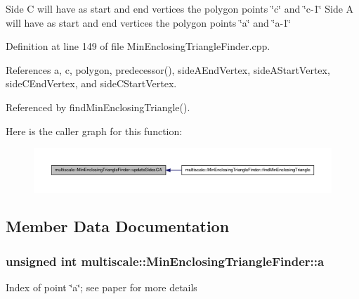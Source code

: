 \-Side \-C will have as start and end vertices the polygon points \char`\"{}c\char`\"{} and \char`\"{}c-\/1\char`\"{} \-Side \-A will have as start and end vertices the polygon points \char`\"{}a\char`\"{} and \char`\"{}a-\/1\char`\"{} 

\-Definition at line 149 of file \-Min\-Enclosing\-Triangle\-Finder.\-cpp.



\-References a, c, polygon, predecessor(), side\-A\-End\-Vertex, side\-A\-Start\-Vertex, side\-C\-End\-Vertex, and side\-C\-Start\-Vertex.



\-Referenced by find\-Min\-Enclosing\-Triangle().



\-Here is the caller graph for this function\-:\nopagebreak
\begin{figure}[H]
\begin{center}
\leavevmode
\includegraphics[width=350pt]{classmultiscale_1_1MinEnclosingTriangleFinder_a0f4a9131f5118fa0afc33344bdf67f16_icgraph}
\end{center}
\end{figure}




\subsection{\-Member \-Data \-Documentation}
\hypertarget{classmultiscale_1_1MinEnclosingTriangleFinder_acb13371219bdd9b7c57131f1535e4c89}{
\subsubsection[{a}]{\setlength{\rightskip}{0pt plus 5cm}unsigned int {\bf multiscale\-::\-Min\-Enclosing\-Triangle\-Finder\-::a}}}\label{classmultiscale_1_1MinEnclosingTriangleFinder_acb13371219bdd9b7c57131f1535e4c89}
\-Index of point \char`\"{}a\char`\"{}; see paper for more details 

